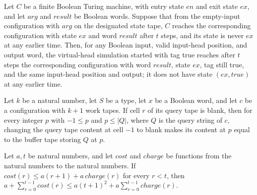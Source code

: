 \begin{theorem}
\label{Turing.oracleFrozenCall}
\leanok
{}
Let $C$ be a finite Boolean Turing machine, with entry state $en$ and exit state $ex$,
and let $arg$ and $result$ be Boolean words. Suppose that from the empty-input
configuration with $arg$ on the designated state tape, $C$ reaches the corresponding
configuration with state $ex$ and word $result$ after $t$ steps, and its state is never
$ex$ at any earlier time. Then, for any Boolean input, valid input-head position, and
output word, the virtual-head simulation started with tag true reaches after $t$ steps
the corresponding configuration with word $result$, state $ex$, tag still true, and the
same input-head position and output; it does not have state $(ex,true)$ at any earlier
time.
\end{theorem}

\begin{theorem}
\label{Turing.oracleQueryWindow}
\leanok
{}
Let $k$ be a natural number, let $S$ be a type, let $x$ be a Boolean word, and let $c$
be a configuration with $k+1$ work tapes. If cell $r$ of its query tape is blank, then
for every integer $p$ with $-1\le p$ and $p\le |Q|$, where $Q$ is the query string of
$c$, changing the query tape content at cell $-1$ to blank makes its content at $p$
equal to the buffer tape storing $Q$ at $p$.
\end{theorem}

\begin{theorem}
\label{Turing.oracleCost_sum}
\leanok
{}
Let $a,t$ be natural numbers, and let $cost$ and $charge$ be functions from the natural
numbers to the natural numbers. If $cost(r)\le a(r+1)+a\,charge(r)$ for every $r<t$,
then $a+\sum_{r=0}^{t-1}cost(r)\le a(t+1)^2+a\sum_{r=0}^{t-1}charge(r)$.
\end{theorem}

